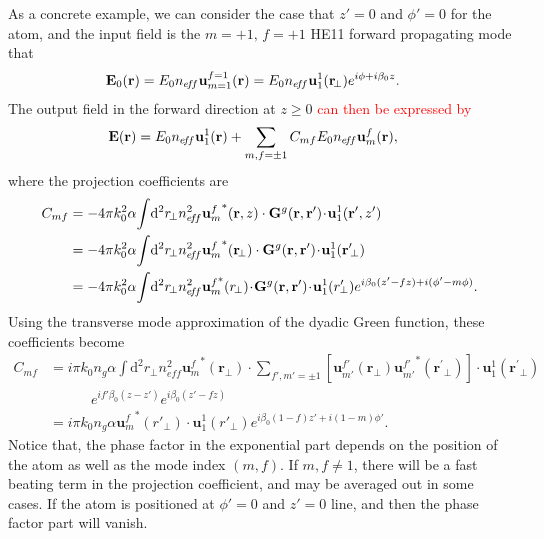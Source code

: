 As a concrete example, we can consider the case that $ z'=0 $ and $ \phi'=0 $ for the atom, and the input field is the $ m=+1,\,f=+1 $ HE11 forward propagating mode that
\begin{align}
\mathbf{E}_0(\mathbf{r}) &= E_0n_{e\!f\!f} \mathbf{u}_{m=1}^{f=1} (\mathbf{r}) = E_0n_{e\!f\!f} \mathbf{u}_1^1 (\mathbf{r}\!_\perp)e^{i\phi+i\beta_0 z}. 
\end{align}
The output field in the forward direction at $ z\ge 0 $ \textcolor{red}{can then be expressed by}
\begin{align}
\mathbf{E}(\mathbf{r}) &= E_0n_{e\!f\!f}\mathbf{u}_{1}^{1} (\mathbf{r}) + \sum_{m,f=\pm 1} C_{mf} E_0n_{e\!f\!f} \mathbf{u}_m^f(\mathbf{r}),  
\end{align}
where the projection coefficients are 
\begin{align}
C_{mf} &= -4\pi k_0^2 \alpha \!\int\! \mathrm{d}^2r\!_\perp n^2_{e\!f\!f} {\mathbf{u}^f_m}^*(\mathbf{r},z)\cdot \mathbf{G}^g(\br,\br') \!\cdot\! \mathbf{u}_1^1(\mathbf{r}^\prime,z')\\
&= -4\pi k_0^2 \alpha \!\int\! \mathrm{d}^2r\!_\perp n^2_{e\!f\!f} {\mathbf{u}^f_m}^*(\mathbf{r}\!_\perp)\cdot \mathbf{G}^g(\br,\br') \!\cdot\! \mathbf{u}_1^1(\mathbf{r}^\prime\!_\perp)\\
&= -4\pi k_0^2 \alpha \!\int\! \mathrm{d}^2r\!_\perp n^2_{e\!f\!f} {\mathbf{u}^f_m}^{\!\!*}(r\!_\perp)\!\cdot\! \mathbf{G}^g(\br,\br') \!\cdot\! \mathbf{u}_1^1(r^\prime\!\!_\perp)e^{i\beta_0(z'-fz)+i(\phi'-m\phi)}.
\end{align}
Using the transverse mode approximation of the dyadic Green function, these coefficients become
\begin{align}
C_{mf} &= i\pi k_0 n_g\alpha \!\int\! \mathrm{d}^2r\!_\perp n^2_{e\!f\!f} {\mathbf{u}^f_m}^*(\mathbf{r}\!_\perp)\cdot\!\!\!\!\!\! \sum_{f',m'=\pm 1}\!\!\!\! \left[\mathbf{u}_{m'}^{f'}(\mathbf{r}\!_\perp){\mathbf{u}^{f'}_{m'}}^*(\mathbf{r}^\prime\!_\perp) \right]\!\cdot\! \mathbf{u}_1^1(\mathbf{r}^\prime\!_\perp)\nonumber\\
&\quad\quad\quad e^{if'\beta_0(z-z')} e^{i\beta_0(z'-fz)}\\
&= i\pi k_0 n_g\alpha  {\mathbf{u}^f_m}^*(r'_{\!\perp})\cdot \mathbf{u}_1^1(r'_{\!\perp})e^{i\beta_0 (1-f)z'+i(1-m)\phi'}.
\end{align}
Notice that, the phase factor in the exponential part depends on the position of the atom as well as the mode index $ (m,f) $. If $ m,f\neq 1 $, there will be a fast beating term in the projection coefficient, and may be averaged out in some cases. If the atom is positioned at $ \phi'=0 $ and $ z'=0 $ line, and then the phase factor part will vanish. 


